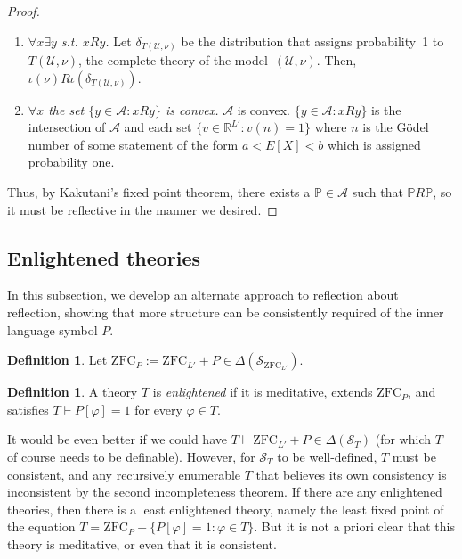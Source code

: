\documentclass[12pt]{article}
\newcommand{\PP}{\mathbb{P}}
\newcommand{\vp}{\varphi}
\newcommand{\RR}{\mathbb{R}}
\newcommand{\zfc}{\mathrm{ZFC}}
\newcommand{\zfcl}{{\zfc_{\cL}}}
\newcommand{\zfcp}{{\zfc_P}}
\newcommand{\cA}{\mathcal{A}}
\newcommand{\cL}{L'}
\newcommand{\cS}{\mathcal{S}}
\newcommand{\cU}{\mathcal{U}}
\theoremstyle{plain}
\theoremstyle{definition}
\newtheorem{definition}[theorem]{Definition}
\theoremstyle{remark}
\begin{document}
\begin{proof}
\begin{enumerate}
\item \emph{$\forall x \exists y$ s.t. $xRy$.} Let $\delta_{T(\cU,\nu)}$ be the distribution that assigns probability~1 to~$T(\cU,\nu)$, the complete theory of the model~$(\cU,\nu)$. Then, $\iota(\nu)R\iota(\delta_{T(\cU,\nu)})$.

\item \emph{$\forall x$ the set $\{y \in \mathcal{A}: xRy\}$ is convex.} $\cA$ is convex. $\{y\in\cA:xRy\}$ is the intersection of $\cA$ and each set $\{v\in\RR^{L'} : v(n) = 1\}$ where $n$ is the G\"odel number of some statement of the form $ a < E[X]< b$ which is assigned probability one.
\end{enumerate}
Thus, by Kakutani's fixed point theorem, there exists a $\PP\in\cA$ such that 
$\PP R\PP$, so it must be reflective in the manner we desired.

\end{proof}
\subsection{Enlightened theories}
In this subsection, we develop an alternate approach to reflection about reflection, showing that more structure can be consistently required of the inner language symbol $P$.
\begin{definition}
Let $\zfcp := \zfcl + P\in\Delta(\cS_\zfcl)$.
\end{definition}
\begin{definition}
A theory $T$ is \emph{enlightened} if it is meditative, extends $\zfcp$, and satisfies $T\vdash P[\vp] = 1$ for every $\vp\in T$.
\end{definition}
It would be even better if we could have $T\vdash\zfcl + P\in\Delta(\cS_T)$ (for which $T$ of course needs to be definable). However, for $\cS_T$ to be well-defined, $T$ must be consistent, and any recursively enumerable $T$ that believes its own consistency is inconsistent by the second incompleteness theorem.
If there are any enlightened theories, then there is a least enlightened theory, namely the least fixed point of the equation $T = \zfcp + \{P[\vp] = 1 : \vp\in T\}$. But it is not a priori clear that this theory is meditative, or even that it is consistent. 
\end{document}
